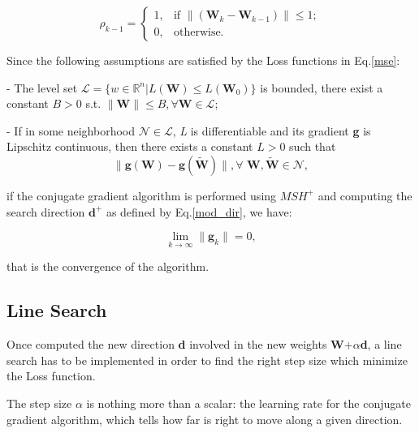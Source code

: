 			\begin{equation}
			\label{rho}
			  \rho_{k-1} =\begin{cases}
			    1 , & \text{if }\|(\textbf{W}_k - \textbf{W}_{k-1})\| \leq 1;\\
			    0 , & \text{otherwise.}
			  \end{cases}
			\end{equation}

			Since the following assumptions are satisfied by the Loss functions in Eq.\ref{mse}:

			\begin{asu} - \label{as:1}
  				The level set $\mathcal{L} = \{w \in \mathbb{R}^n | \textit{L}(\textbf{W}) \leq L(\textbf{W}_0)\}$ is bounded, there exist a constant $B > 0$ s.t. $\|\textbf{W}\| \leq B, \forall \textbf{W} \in \mathcal{L}$;
			\end{asu}

			\begin{asu} - \label{as:2}
				If in some neighborhood $\mathcal{N} \in \mathcal{L}$, \textit{L} is differentiable and its gradient \textbf{g} is Lipschitz continuous, then there exists a constant $ L > 0 $ such that
				\begin{equation}
				\label{ass2}
				  \|\textbf{g}(\textbf{W})-\textbf{g}(\widetilde{\textbf{W}})\|, \forall \textbf{ W},\widetilde{\textbf{W}} \in \mathcal{N},
				\end{equation}
			\end{asu}
			if the conjugate gradient algorithm is performed using $MSH^+$ and computing the search direction $\textbf{d}^+$ as defined by Eq.\ref{mod_dir}, we have:

			\begin{equation}
			\label{conv_mhs}
			  \lim_{k \to \infty} \|\textbf{g}_k\| = 0,
			\end{equation}

			that is the convergence of the algorithm.


		\subsection{Line Search}
		\label{sub:line_search}
			Once computed the new direction \textbf{d} involved in the new weights \textbf{W}+$\alpha$\textbf{d}, a line search has to be implemented in order to find the right step size which minimize the Loss function.

			The step size $\alpha$ is nothing more than a scalar: the learning rate for the conjugate gradient algorithm, which tells how far is right to move along a given direction.

